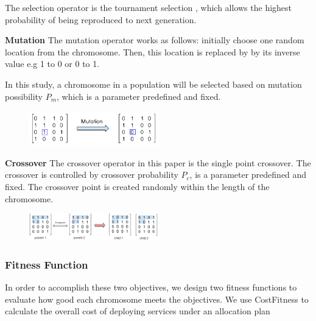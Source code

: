 \documentclass{llncs}
\begin{document}
The selection operator is the tournament selection \cite{Xie:2008:AMI:1389095.1389347}, which allows the highest probability 
of being reproduced to next generation.

\begin{flushleft}\textbf{Mutation} The mutation operator works as follows: initially choose one random location from the chromosome. 
Then, this location is replaced by by its inverse value e.g 1 to 0 or 0 to 1.
\end{flushleft}

In this study, a chromosome in a population will be selected based on mutation possibility $P_{m}$, which is 
a parameter predefined and fixed.
\begin{figure}[ht]
\centering
	\includegraphics[width=0.5\textwidth]{pics/mutation.png}
\caption{}
\label{graph1}
\end{figure}
\begin{flushleft}\textbf{Crossover} The crossover operator in this paper is the single point crossover. 
The crossover is controlled by crossover probability $P_{c}$, is a parameter predefined and fixed.
The crossover point is created randomly within the length of the chromosome. 
\end{flushleft}
\begin{figure}[ht]
\centering
	\includegraphics[width=0.5\textwidth]{pics/crossover.png}
\caption{}
\label{graph2}
\end{figure}

\subsubsection{Fitness Function}
\label{sec:fitness_functions}
\begin{flushleft}In order to accomplish these two objectives, we design two fitness functions to evaluate 
how good each chromosome meets the objectives. We use CostFitness to calculate the overall cost of deploying services under an allocation plan\end{flushleft}
\end{document}
